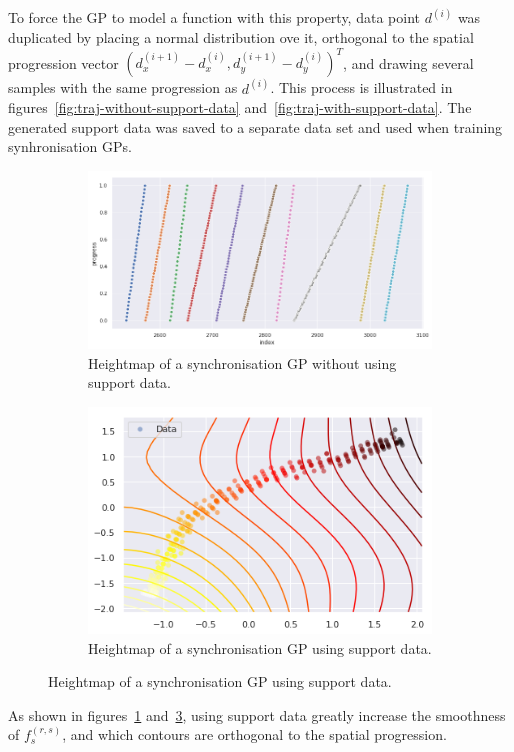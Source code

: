 To force the GP to model a function with this property, data point $d^{(i)}$ was duplicated by placing a normal distribution ove it, orthogonal to the spatial progression vector ${(d^{(i+1)}_x - d^{(i)}_x, d^{(i+1)}_y - d^{(i)}_y)}^T$, and drawing several samples with the same progression as $d^{(i)}$. This process is illustrated in figures~\ref{fig:traj-without-support-data} and~\ref{fig:traj-with-support-data}. The generated support data was saved to a separate data set and used when training synhronisation GPs.

\begin{figure}[H]
  \begin{subfigure}[b]{0.5\textwidth}
    \includegraphics[width=\textwidth]{figures/normalised-stop-compressed.png}
    \caption{Heightmap of a synchronisation GP without using support data.}
    \label{fig:heightmap-without-support}
  \end{subfigure}
  \begin{subfigure}[b]{0.5\textwidth}
    \includegraphics[width=\textwidth]{figures/synch-gp-hm.png}
    \caption{Heightmap of a synchronisation GP using support data.}
    \label{fig:heightmap-with-support}
  \end{subfigure}
\end{figure}

As shown in figures~\ref{fig:heightmap-without-support} and~\ref{fig:heightmap-with-support}, using support data greatly increase the smoothness of $f^{(r,s)}_s$, and which contours are orthogonal to the spatial progression.


